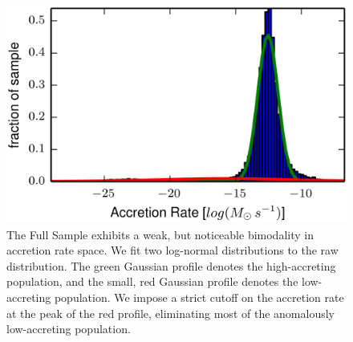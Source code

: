 \begin{figure}
\centering{}\includegraphics[clip]{Figures/Illustris2_bhpop_mdot}
\protect\caption{\label{fig:bhpop_mdot}The Full Sample exhibits a weak, but noticeable
bimodality in accretion rate space. We fit two log-normal distributions
to the raw distribution. The green Gaussian profile denotes the high-accreting
population, and the small, red Gaussian profile denotes the low-accreting
population. We impose a strict cutoff on the accretion rate at the
peak of the red profile, eliminating most of the anomalously low-accreting
population.}
\end{figure}
